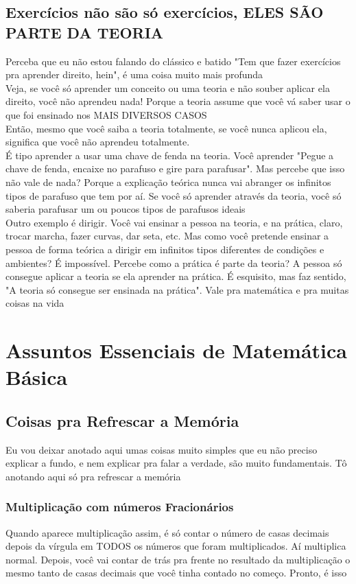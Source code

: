 \documentclass{article}
\begin{document}
\subsection{Exercícios não são só exercícios, ELES SÃO PARTE DA TEORIA}
Perceba que eu não estou falando do clássico e batido "Tem que fazer exercícios pra aprender direito, hein", é uma coisa muito mais profunda
\\[5pt]
Veja, se você só aprender um conceito ou uma teoria e não souber aplicar ela direito, você não aprendeu nada! Porque a teoria assume que você vá saber usar o que foi ensinado nos MAIS DIVERSOS CASOS
\\[5pt]
Então, mesmo que você saiba a teoria totalmente, se você nunca aplicou ela, significa que você não aprendeu totalmente.
\\[5pt]
É tipo aprender a usar uma chave de fenda na teoria. Você aprender "Pegue a chave de fenda, encaixe no parafuso e gire para parafusar". Mas percebe que isso não vale de nada? Porque a explicação teórica nunca vai abranger os infinitos tipos de parafuso que tem por aí. Se você só aprender através da teoria, você só saberia parafusar um ou poucos tipos de parafusos ideais
\\[5pt]
Outro exemplo é dirigir. Você vai ensinar a pessoa na teoria, e na prática, claro, trocar marcha, fazer curvas, dar seta, etc. Mas como você pretende ensinar a pessoa de forma teórica a dirigir em infinitos tipos diferentes de condições e ambientes? É impossível. Percebe como a prática é parte da teoria? A pessoa só consegue aplicar a teoria se ela aprender na prática. É esquisito, mas faz sentido, "A teoria só consegue ser ensinada na prática". Vale pra matemática e pra muitas coisas na vida

\section{Assuntos Essenciais de Matemática Básica}

\subsection{Coisas pra Refrescar a Memória}
Eu vou deixar anotado aqui umas coisas muito simples que eu não preciso explicar a fundo, e nem explicar pra falar a verdade, são muito fundamentais. Tô anotando aqui só pra refrescar a memória 

\subsubsection{Multiplicação com números Fracionários}
Quando aparece multiplicação assim, é só contar o número de casas decimais depois da vírgula em TODOS os números que foram multiplicados. Aí multiplica normal. Depois, você vai contar de trás pra frente no resultado da multiplicação o mesmo tanto de casas decimais que você tinha contado no começo. Pronto, é isso
\end{document}
